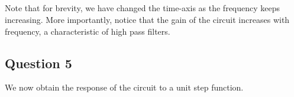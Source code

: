 \documentclass[11pt]{article}
\begin{document}
    \begin{center}
    \end{center}
    { \hspace*{\fill} \\}
    
    \begin{center}
    \end{center}
    { \hspace*{\fill} \\}
    
    \begin{center}
    \end{center}
    { \hspace*{\fill} \\}
    
    \begin{center}
    \end{center}
    { \hspace*{\fill} \\}
    
    Note that for brevity, we have changed the time-axis as the frequency
keeps increasing. More importantly, notice that the gain of the circuit
increases with frequency, a characteristic of high pass filters.

\hypertarget{question-5}{%
\subsection{Question 5}\label{question-5}}

We now obtain the response of the circuit to a unit step function.
\end{document}
